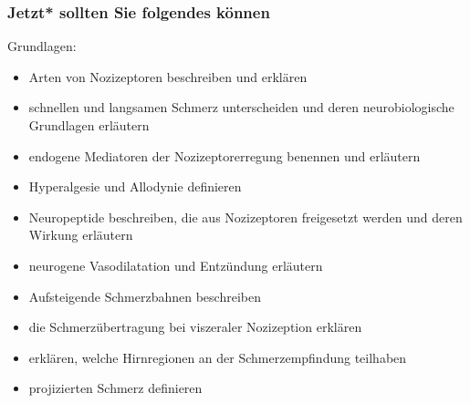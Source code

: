 \documentclass{beamer}
\begin{document}








\begin{frame}


 \frametitle{Jetzt* sollten Sie folgendes können}



\begin{block}{Grundlagen:}




\begin{itemize}

    \item 
    
Arten von Nozizeptoren beschreiben und erklären
    \item 
 schnellen und langsamen Schmerz unterscheiden und deren neurobiologische Grundlagen erläutern
    \item 
 endogene Mediatoren der Nozizeptorerregung benennen und erläutern
    \item 
    Hyperalgesie und Allodynie definieren
    \item 
 Neuropeptide beschreiben, die aus Nozizeptoren freigesetzt werden und deren Wirkung erläutern
    \item 
 neurogene Vasodilatation und Entzündung erläutern
    \item 
 Aufsteigende Schmerzbahnen beschreiben
    \item 
 die Schmerzübertragung bei viszeraler Nozizeption erklären
    \item 
erklären, welche  Hirnregionen an der Schmerzempfindung teilhaben
    \item 
 projizierten Schmerz definieren

\end{itemize}


\end{block}

\end{frame}
\end{document}
